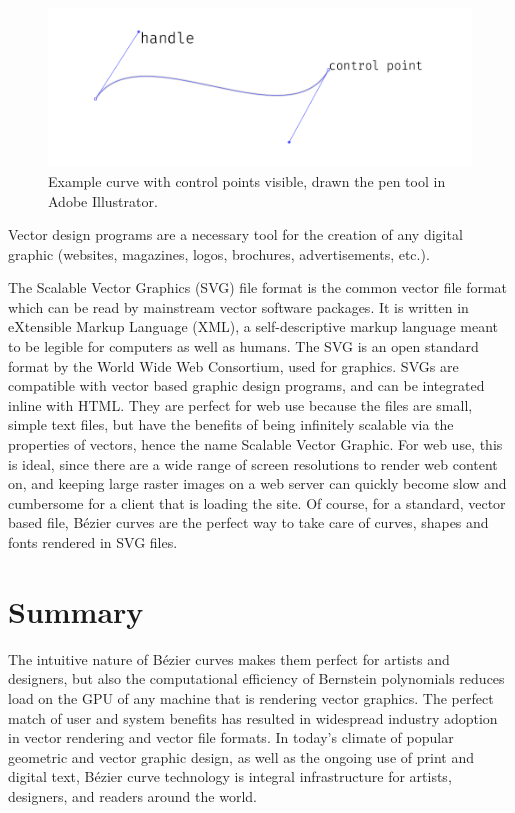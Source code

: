 \documentclass[12pt,letterpaper]{article}
\begin{document}
\begin{figure}[H]
    \centering
    \includegraphics[width=\textwidth]{illustrator-ex}
    \caption{Example curve with control points visible, drawn the pen tool in Adobe Illustrator.}
\end{figure}

Vector design programs are a necessary tool for the creation of any digital graphic (websites, magazines, logos, brochures, advertisements, etc.). 

The Scalable Vector Graphics (SVG) file format is the common vector file format which can be read by mainstream vector software packages. It is written in eXtensible Markup Language (XML), a self-descriptive markup language meant to be legible for computers as well as humans. The SVG is an open standard format by the World Wide Web Consortium, used for graphics. SVGs are compatible with vector based graphic design programs, and can be integrated inline with HTML. They are perfect for web use because the files are small, simple text files, but have the benefits of being infinitely scalable via the properties of vectors, hence the name Scalable Vector Graphic. For web use, this is ideal, since there are a wide range of screen resolutions to render web content on, and keeping large raster images on a web server can quickly become slow and cumbersome for a client that is loading the site. Of course, for a standard, vector based file, B\'ezier curves are the perfect way to take care of curves, shapes and fonts rendered in SVG files.

\section{Summary}
The intuitive nature of B\'ezier curves makes them perfect for artists and designers, but also the computational efficiency of Bernstein polynomials reduces load on the GPU of any machine that is rendering vector graphics. The perfect match of user and system benefits has resulted in widespread industry adoption in vector rendering and vector file formats. In today's climate of popular geometric and vector graphic design, as well as the ongoing use of print and digital text, B\'ezier curve technology is integral infrastructure for artists, designers, and readers around the world. 
\end{document}
